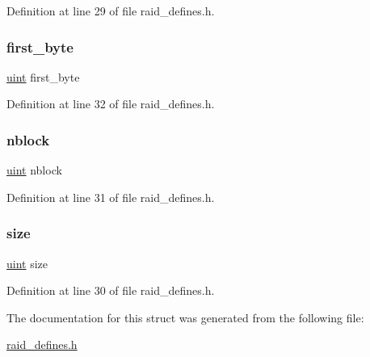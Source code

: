 Definition at line 29 of file raid\+\_\+defines.\+h.

\mbox{\label{structinode__s_a4513cc558a2d925cd5b3023ea6b3ba62}} 
\subsubsection{\texorpdfstring{first\+\_\+byte}{first\_byte}}
{\footnotesize\ttfamily \hyperlink{raid__defines_8h_a91ad9478d81a7aaf2593e8d9c3d06a14}{uint} first\+\_\+byte}



Definition at line 32 of file raid\+\_\+defines.\+h.

\mbox{\label{structinode__s_afe7beb909cfc74858acbb6c26d5d0e00}} 
\subsubsection{\texorpdfstring{nblock}{nblock}}
{\footnotesize\ttfamily \hyperlink{raid__defines_8h_a91ad9478d81a7aaf2593e8d9c3d06a14}{uint} nblock}



Definition at line 31 of file raid\+\_\+defines.\+h.

\mbox{\label{structinode__s_a22d26304a3b3aca97e6311f6939dd1bf}} 
\subsubsection{\texorpdfstring{size}{size}}
{\footnotesize\ttfamily \hyperlink{raid__defines_8h_a91ad9478d81a7aaf2593e8d9c3d06a14}{uint} size}



Definition at line 30 of file raid\+\_\+defines.\+h.



The documentation for this struct was generated from the following file\+:\begin{DoxyCompactItemize}
\item 
\hyperlink{raid__defines_8h}{raid\+\_\+defines.\+h}\end{DoxyCompactItemize}
